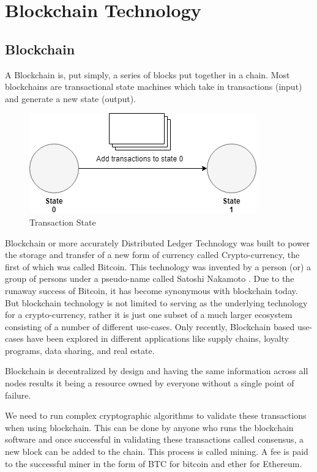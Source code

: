 \documentclass[11pt,openright]{report}
\begin{document}
\chapter{Blockchain Technology}
\label{chapter:blockchain_tech}
\section{Blockchain}
A Blockchain is, put simply, a series of blocks put together in a chain. Most blockchains are transactional state machines which take in transactions (input) and generate a new state (output).
\begin{figure}
    \centering
    \includegraphics[scale=0.5]{images/statemachine.png}
    \caption{Transaction State}
    \label{fig:State Change Diagram}
\end{figure}

Blockchain or more accurately Distributed Ledger Technology was built to power the storage and transfer of a new form of currency called Crypto-currency, the first of which was called Bitcoin. This technology was invented by a person (or) a group of persons under a pseudo-name called Satoshi Nakamoto \cite{nakamoto2012bitcoin}. Due to the runaway success of Bitcoin, it has become synonymous with blockchain today. But blockchain technology is not limited to serving as the underlying technology for a crypto-currency, rather it is just one subset of a much larger ecosystem consisting of a number of different use-cases. Only recently, Blockchain based use-cases have been explored in different applications like supply chains, loyalty programs, data sharing, and real estate.

Blockchain is decentralized by design \cite{gencer2018decentralization} and having the same information across all nodes results it being a resource owned by everyone without a single point of failure. 

We need to run complex cryptographic algorithms to validate these transactions when using blockchain. This can be done by anyone who runs the blockchain software and once successful in validating these transactions called consensus, a new block can be added to the chain. This process is called mining. A fee is paid to the successful miner in the form of BTC for bitcoin and ether for Ethereum.
\end{document}
